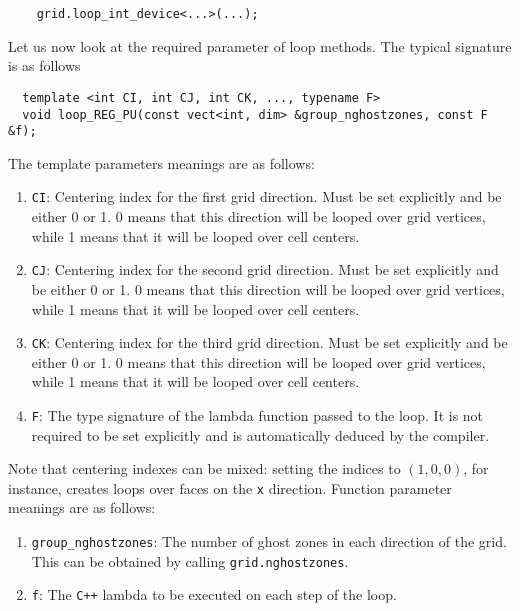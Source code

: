 \begin{lstlisting}
    grid.loop_int_device<...>(...);
\end{lstlisting}

Let us now look at the required parameter of loop methods. The typical signature is as follows

\begin{lstlisting}
  template <int CI, int CJ, int CK, ..., typename F>
  void loop_REG_PU(const vect<int, dim> &group_nghostzones, const F &f);
\end{lstlisting}

The template parameters meanings are as follows:

\begin{enumerate}
  \item \texttt{CI}: Centering index for the first grid direction. Must be set explicitly and be either 0 or 1. 0 means that this direction will be looped over grid vertices, while 1 means that it will be looped over cell centers.
  \item \texttt{CJ}: Centering index for the second grid direction. Must be set explicitly and be either 0 or 1. 0 means that this direction will be looped over grid vertices, while 1 means that it will be looped over cell centers.
  \item \texttt{CK}: Centering index for the third grid direction. Must be set explicitly and be either 0 or 1. 0 means that this direction will be looped over grid vertices, while 1 means that it will be looped over cell centers.
  \item \texttt{F}: The type signature of the lambda function passed to the loop. It is not required to be set explicitly and is automatically deduced by the compiler.
\end{enumerate}

Note that centering indexes can be mixed: setting the indices to $(1,0,0)$, for instance, creates loops over faces on the \texttt{x} direction. Function parameter meanings are as follows:

\begin{enumerate}
  \item \texttt{group\_nghostzones}: The number of ghost zones in each direction of the grid. This can be obtained by calling \texttt{grid.nghostzones}.
  \item \texttt{f}: The \texttt{C++} lambda to be executed on each step of the loop.
\end{enumerate}

